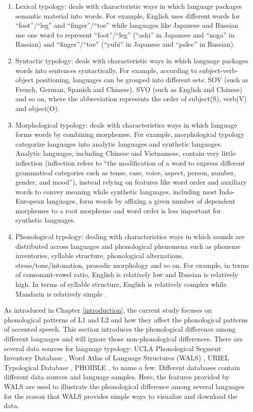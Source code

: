 \begin{enumerate}
\item Lexical typology: deals with characteristic ways in which language packages semantic material into words. For example, English uses different words for ``foot''/``leg'' and ``finger''/``toe'' while languages like Japanese and Russian use one word to represent ``foot''/``leg'' (``ashi'' in Japanese and ``noga'' in Russian) and ``finger''/``toe'' (``yubi'' in Japanese and ``palec'' in Russian).
\item Syntactic typology: deals with characteristic ways in which language packages words into sentences syntactically. For example, according to subject-verb-object positioning, languages can be grouped into different sets: SOV (such as French, German, Spanish and Chinese), SVO (such as English and Chinese) and so on, where the abbreviation represents the order of subject(S), verb(V) and object(O).
\item Morphological typology: deals with characteristics ways in which language forms words by combining morphemes. For example, morphological typology categorize languages into analytic languages and synthetic languages. Analytic languages, including Chinese and Vietnamese, contain very little inflection (inflection refers to ``the modification of a word to express different grammatical categories such as tense, case, voice, aspect, person, number, gender, and mood''), instead relying on features like word order and auxiliary words to convey meaning while synthetic languages, including most Indo-European languages, form words by affixing a given number of dependent morphemes to a root morpheme and word order is less important for synthetic languages.
\item Phonological typology: dealing with characteristics ways in which sounds are distributed across languages and phonological phenomena such as phoneme inventories, syllable structure, phonological alternations, stress/tone/intonation, prosodic morphology and so on. For example, in terms of consonant-vowel ratio, English is relatively low and Russian is relatively high. In terms of syllable structure, English is relatively complex while Mandarin is relatively simple \citep{wals}.
\end{enumerate}

As introduced in Chapter \ref{introduction}, the current study focuses on phonological patterns of L1 and L2 and how they affect the phonological patterns of accented speech. This section introduces the phonological difference among different languages and will ignore those non-phonological differences. There are several data sources for language typology: UCLA Phonological Segment Inventory Database \citep{maddieson1992ucla}, Word Atlas of Language Structures (WALS) \citep{wals}, URIEL Typological Database \citep{littel2016uriel}, PHOIBLE \citep{phoible}, to name a few. Different databases contain different data sources and language samples. Here, the features provided by WALS are used to illustrate the phonological difference among several languages for the reason that WALS provides simple ways to visualize and download the data.

